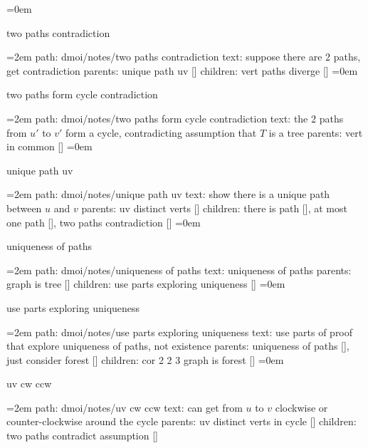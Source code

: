 \leftskip=0em
\par\endgroup
\bigskip
{}
two paths contradiction
\smallskip
\par\begingroup
\leftskip=2em
path: dmoi/notes/two paths contradiction
\smallskip
text:  suppose there are 2 paths, get contradiction
\smallskip
parents:  unique path uv []
\smallskip
children: vert paths diverge []
\smallskip
\leftskip=0em
\par\endgroup
\bigskip
{}
two paths form cycle contradiction
\smallskip
\par\begingroup
\leftskip=2em
path: dmoi/notes/two paths form cycle contradiction
\smallskip
text:  the 2 paths from $u'$ to $v'$ form a cycle, contradicting assumption that $T$ is a tree
\smallskip
parents:  vert in common []
\smallskip
\leftskip=0em
\par\endgroup
\bigskip
{}
unique path uv
\smallskip
\par\begingroup
\leftskip=2em
path: dmoi/notes/unique path uv
\smallskip
text:  show there is a unique path between $u$ and $v$
\smallskip
parents:  uv distinct verts []
\smallskip
children: there is path [], at most one path [], two paths contradiction []
\smallskip
\leftskip=0em
\par\endgroup
\bigskip
{}
uniqueness of paths
\smallskip
\par\begingroup
\leftskip=2em
path: dmoi/notes/uniqueness of paths
\smallskip
text:  uniqueness of paths
\smallskip
parents:  graph is tree []
\smallskip
children: use parts exploring uniqueness []
\smallskip
\leftskip=0em
\par\endgroup
\bigskip
{}
use parts exploring uniqueness
\smallskip
\par\begingroup
\leftskip=2em
path: dmoi/notes/use parts exploring uniqueness
\smallskip
text:  use parts of proof that explore uniqueness of paths, not existence
\smallskip
parents:  uniqueness of paths [], just consider forest []
\smallskip
children: cor 2 2 3 graph is forest []
\smallskip
\leftskip=0em
\par\endgroup
\bigskip
{}
uv cw ccw
\smallskip
\par\begingroup
\leftskip=2em
path: dmoi/notes/uv cw ccw
\smallskip
text:  can get from $u$ to $v$ clockwise or counter-clockwise around the cycle
\smallskip
parents:  uv distinct verts in cycle []
\smallskip
children: two paths contradict assumption []
